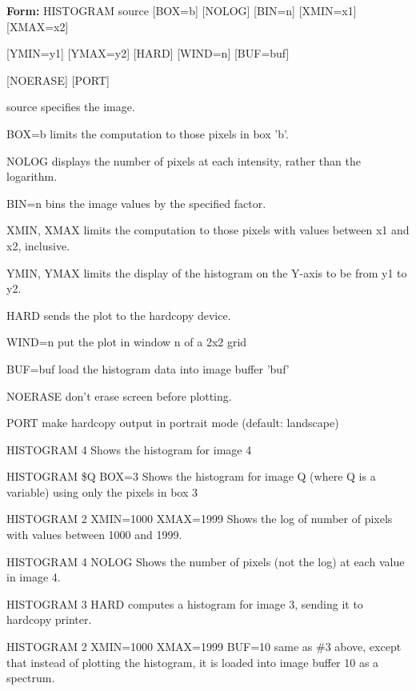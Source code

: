 {\newpage\clearpage
{}%
\begin{command}
  \item[\textbf{Form:}   HISTOGRAM source {[BOX=b]} {[NOLOG]} {[BIN=n]} {[XMIN=x1]} {[XMAX=x2]}\hfill]{}
  \item{{[YMIN=y1]} {[YMAX=y2]} {[HARD]} {[WIND=n]} {[BUF=buf]}}
  \item{{[NOERASE]} {[PORT]}}
  \item[source\hfill]{   specifies the image.}
  \item[BOX=b\hfill]{limits the computation to those pixels in box 'b'.}
  \item[NOLOG\hfill]{displays the number of pixels at each intensity,
rather than the logarithm.}
  \item[BIN=n\hfill]{   bins the image values by the specified factor.}
  \item[XMIN, XMAX\hfill]{  limits the computation to those pixels with values
between x1 and x2, inclusive.}
  \item[YMIN, YMAX   \hfill]{   limits the display of the histogram on the Y-axis
to be from y1 to y2.}
  \item[HARD\hfill]{sends the plot to the hardcopy device.}
  \item[WIND=n\hfill]{put the plot in window n of a 2x2 grid}
  \item[BUF=buf\hfill]{  load the histogram data into image buffer 'buf'}
  \item[   NOERASE   \hfill]{don't erase screen before plotting.}
  \item[PORT\hfill]{make hardcopy output in portrait mode (default: landscape)}
\end{command}%
\lthtmlfigureZ
\lthtmlcheckvsize\clearpage}

{\newpage\clearpage
{}%
\begin{example}
  \item[HISTOGRAM 4 \hfill]{Shows the histogram for image 4}
  \item[HISTOGRAM \$Q BOX=3 \hfill]{Shows the histogram for image Q 
       (where Q is a variable) using only the pixels in box 3}
  \item[HISTOGRAM 2 XMIN=1000 XMAX=1999 \hfill]{
       Shows the log of number of pixels with values between 1000 and 1999.}
  \item[HISTOGRAM 4 NOLOG \hfill]{
       Shows the number of pixels (not the log) at each value in image 4.}
  \item[HISTOGRAM 3 HARD\hfill]{
       computes a histogram for image 3, sending it to hardcopy printer.}
  \item[HISTOGRAM 2 XMIN=1000 XMAX=1999 BUF=10\hfill]{ same as \#3 above,
       except that instead of plotting the histogram, it is loaded into image
       buffer 10 as a spectrum.}
\end{example}%
\lthtmlfigureZ
\lthtmlcheckvsize\clearpage}

